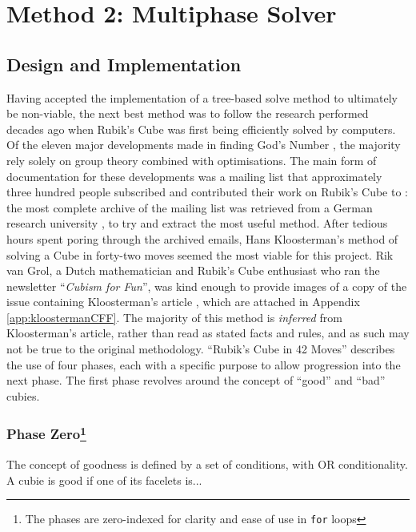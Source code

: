 \documentclass{report}
\newcommand{\tit}[1]{\textit{#1}}
\newcommand{\propernoun}[1]{\enquote{\tit{#1}}}
\begin{document}
	\section{Method 2: Multiphase Solver} \label{sec:multiphaseSolving}
	
	\subsection{Design and Implementation}
	
	Having accepted the implementation of a tree-based solve method to ultimately be non-viable, the next best method was to follow the research performed decades ago when Rubik's Cube was first being efficiently solved by computers. Of the eleven major developments made in finding God's Number \cite{Rokicki2010}, the majority rely solely on group theory combined with optimisations. The main form of documentation for these developments was a mailing list that approximately three hundred people subscribed and contributed their work on Rubik's Cube to \cite{Schoenert1996}: the most complete archive of the mailing list was retrieved from a German research university \cite{Schoenert1996}, \cite{RWTHAachenUniversity} to try and extract the most useful method. After tedious hours spent poring through the archived emails, Hans Kloosterman's method of solving a Cube in forty-two moves seemed the most viable for this project. Rik van Grol, a Dutch mathematician and Rubik's Cube enthusiast who ran the newsletter \propernoun{Cubism for Fun}, was kind enough to provide images of a copy of the issue containing Kloosterman's article \cite{Kloosterman1990}, which are attached in Appendix \ref{app:kloostermanCFF}.	The majority of this method is \tit{inferred} from Kloosterman's article, rather than read as stated facts and rules, and as such may not be true to the original methodology. \enquote{Rubik's Cube in 42 Moves} describes the use of four phases, each with a specific purpose to allow progression into the next phase. The first phase revolves around the concept of \enquote{good} and \enquote{bad} cubies. 
	
	\subsubsection[Phase Zero]{Phase Zero\protect\footnote{The phases are zero-indexed for clarity and ease of use in \lstinline|for| loops}}
	
	The concept of goodness is defined by a set of conditions, with OR conditionality. A cubie is good if one of its facelets is...
	
\end{document}
